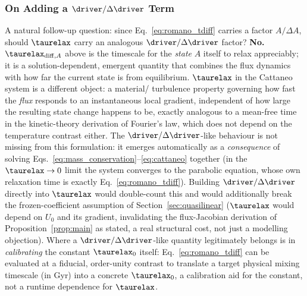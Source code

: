 \subsubsection{On Adding a $\driver/\Delta\driver$ Term}
\label{sec:no-q-over-dq}
A natural follow-up question: since Eq.~\eqref{eq:romano_tdiff} carries a
factor $A/\Delta A$, should $\taurelax$ carry an analogous
$\driver/\Delta\driver$ factor? \textbf{No.} $\taurelax_{{\rm diff},A}$
above is the timescale for the \emph{state} $A$ itself to relax
appreciably; it is a solution-dependent, emergent quantity that combines
the flux dynamics with how far the current state is from equilibrium.
$\taurelax$ in the Cattaneo system is a different object: a material/
turbulence property governing how fast the \emph{flux} responds to an
instantaneous local gradient, independent of how large the resulting
state change happens to be, exactly analogous to a mean-free time in the
kinetic-theory derivation of Fourier's law, which does not depend on the
temperature contrast either. The $\driver/\Delta\driver$-like behaviour is
not missing from this formulation: it emerges automatically as a
\emph{consequence} of solving Eqs.~\eqref{eq:mass_conservation}--\eqref{eq:cattaneo}
together (in the $\taurelax\to0$ limit the system converges to the
parabolic equation, whose own relaxation time is exactly
Eq.~\eqref{eq:romano_tdiff}). Building $\driver/\Delta\driver$ directly
into $\taurelax$ would double-count this and would additionally break the
frozen-coefficient assumption of Section~\ref{sec:quasilinear} ($\taurelax$
would depend on $U_0$ and its gradient, invalidating the flux-Jacobian
derivation of Proposition~\ref{prop:main} as stated, a real structural
cost, not just a modelling objection). Where a $\driver/\Delta\driver$-like
quantity legitimately belongs is in \emph{calibrating} the constant
$\taurelax_0$ itself: Eq.~\eqref{eq:romano_tdiff} can be evaluated at a
fiducial, order-unity contrast to translate a target physical mixing
timescale (in Gyr) into a concrete $\taurelax_0$, a calibration aid for
the constant, not a runtime dependence for $\taurelax$.

